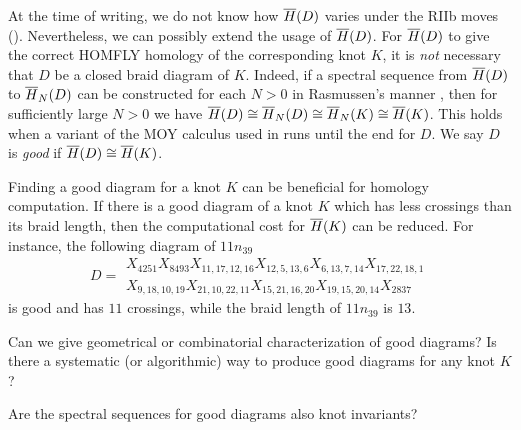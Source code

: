 At the time of writing, we do not know how $\overline{H}(D)$ varies under the RIIb moves  (). Nevertheless, we can possibly extend the usage of $\overline{H}(D)$. For $\overline{H}(D)$ to give the correct HOMFLY homology of the corresponding knot $K$, it is \textit{not} necessary that $D$ be a closed braid diagram of $K$.
Indeed, if a spectral sequence from $\overline{H}(D)$ to $\overline{H}_N(D)$ can be constructed for each $N > 0$ in Rasmussen's manner \cite{Ras15}, then for sufficiently large $N > 0$ we have $\overline{H}(D) \cong \overline{H}_N(D) \cong \overline{H}_N(K) \cong \overline{H}(K)$. This holds when a variant of the MOY calculus used in \cite{Ras15, Wu08} runs until the end for $D$. We say $D$ is \textit{good} if $\overline{H}(D) \cong \overline{H}(K)$.

Finding a good diagram for a knot $K$ can be beneficial for homology computation. 
If there is a good diagram of a knot $K$ which has less crossings than its braid length, then the computational cost for $\overline{H}(K)$ can be reduced. For instance, the following diagram of $11n_{39}$
\[
D =
\begin{array}{l}
    X_{4251}X_{8493}X_{11,17,12,16}X_{12,5,13,6}X_{6,13,7,14}X_{17,22,18,1}\\
    X_{9,18,10,19}X_{21,10,22,11}X_{15,21,16,20}X_{19,15,20,14}X_{2837}
\end{array}
\]
is good and has $11$ crossings, while the braid length of $11n_{39}$ is $13$.

\begin{question}
    Can we give geometrical or combinatorial characterization of good diagrams? Is there a systematic (or algorithmic) way to produce good diagrams for any knot $K$?
\end{question}

\begin{question}
    Are the spectral sequences for good diagrams also knot invariants?
\end{question}